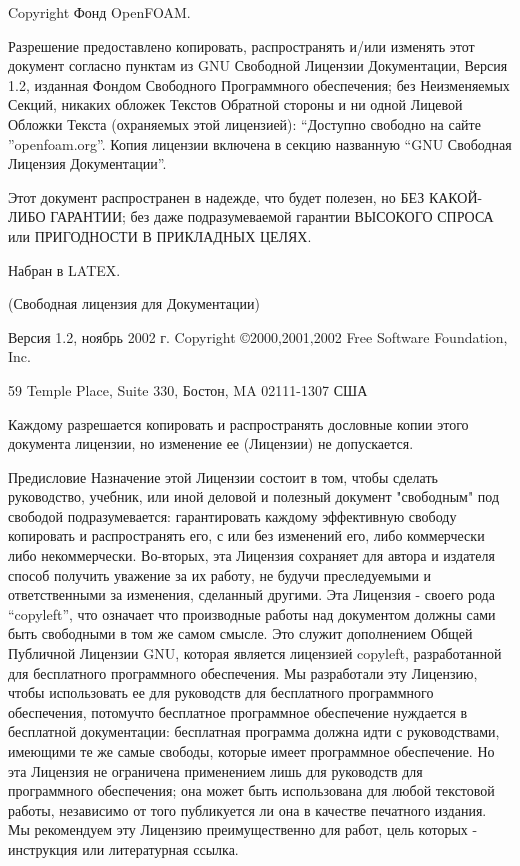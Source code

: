 
Copyright  Фонд OpenFOAM.

Разрешение предоставлено копировать, распространять и/или изменять этот документ согласно пунктам из GNU
 Свободной Лицензии Документации, Версия 1.2, изданная Фондом Свободного Программного обеспечения; без Неизменяемых Секций,
 никаких обложек Текстов Обратной стороны и ни одной Лицевой Обложки Текста (охраняемых этой лицензией):
“Доступно свободно на сайте ”openfoam.org”. Копия лицензии включена в секцию названную “GNU Свободная Лицензия Документации”.

Этот документ распространен в надежде, что будет полезен, но БЕЗ КАКОЙ-ЛИБО ГАРАНТИИ; без даже подразумеваемой гарантии
 ВЫСОКОГО СПРОСА или ПРИГОДНОСТИ В ПРИКЛАДНЫХ ЦЕЛЯХ.

Набран в LATEX.





(Свободная лицензия для Документации)

Версия 1.2, ноябрь 2002 г.
Copyright ©2000,2001,2002 Free Software Foundation, Inc.

59 Temple Place, Suite 330, Бостон, MA 02111-1307 США

Каждому разрешается копировать и распространять дословные копии этого документа лицензии, но изменение ее (Лицензии)
 не допускается.

Предисловие
Назначение этой Лицензии состоит в том, чтобы сделать руководство, учебник, или иной деловой и полезный документ
 "свободным" под свободой подразумевается: гарантировать каждому эффективную свободу копировать и распространять его,
 с или без изменений его, либо коммерчески либо некоммерчески. Во-вторых, эта Лицензия сохраняет для автора и издателя
 способ получить уважение за их работу, не будучи преследуемыми и ответственными за изменения, сделанный другими.
Эта Лицензия - своего рода “copyleft”, что означает что производные работы над документом должны сами быть свободными
 в том же самом смысле. Это служит дополнением Общей Публичной Лицензии GNU, которая является лицензией copyleft,
 разработанной для бесплатного программного обеспечения.
Мы разработали эту Лицензию, чтобы использовать ее для руководств для бесплатного программного обеспечения, потомучто
 бесплатное программное обеспечение нуждается в бесплатной документации: бесплатная программа должна идти с руководствами,
 имеющими те же самые свободы, которые имеет программное обеспечение. Но эта Лицензия не ограничена применением лишь для
 руководств для программного обеспечения; она может быть использована для любой текстовой работы, независимо от того
 публикуется ли она в качестве печатного издания. Мы рекомендуем эту Лицензию преимущественно для работ, цель которых -
 инструкция или литературная ссылка.

